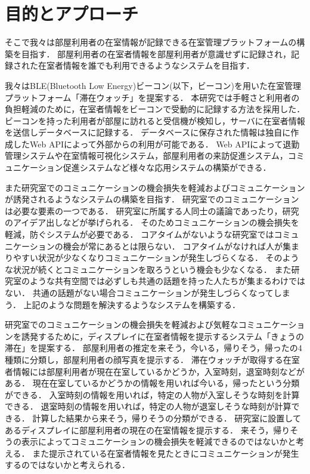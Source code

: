 \section{目的とアプローチ}\label{1.2}
そこで我々は部屋利用者の在室情報が記録できる在室管理プラットフォームの構築を目指す．
部屋利用者の在室者情報を部屋利用者が意識せずに記録され，記録された在室者情報を誰でも利用できるようなシステムを目指す．

我々はBLE(Bluetooth Low Energy)ビーコン(以下，ビーコン)\cite{beacon}を用いた在室管理プラットフォーム「滞在ウォッチ」を提案する．
本研究では手軽さと利用者の負担軽減のために，在室者情報をビーコンで受動的に記録する方法を採用した．%
ビーコンを持った利用者が部屋に訪れると受信機が検知し，サーバに在室者情報を送信しデータベースに記録する．
データベースに保存された情報は独自に作成したWeb APIによって外部からの利用が可能である．
Web APIによって退勤管理システムや在室情報可視化システム，部屋利用者の来訪促進システム，コミュニケーション促進システムなど様々な応用システムの構築ができる．

また研究室でのコミュニケーションの機会損失を軽減およびコミュニケーションが誘発されるようなシステムの構築を目指す．
研究室でのコミュニケーションは必要な要素の一つである．
研究室に所属する人同士の議論であったり，研究のアイデア出しなどが挙げられる．
そのためコミュニケーションの機会損失を軽減，防ぐシステムが必要である．
コアタイムがないような研究室ではコミュニケーションの機会が常にあるとは限らない．
コアタイムがなければ人が集まりやすい状況が少なくなりコミュニケーションが発生しづらくなる．
そのような状況が続くとコミュニケーションを取ろうという機会も少なくなる．
また研究室のような共有空間では必ずしも共通の話題を持った人たちが集まるわけではない．
共通の話題がない場合コミュニケーションが発生しづらくなってしまう．
上記のような問題を解決するようなシステムを構築する．

研究室でのコミュニケーションの機会損失を軽減および気軽なコミュニケーションを誘発するために，ディスプレイに在室者情報を提示するシステム「きょうの滞在」を提案する．
部屋利用者の推定を来そう，今いる，帰りそう，帰ったの4種類に分類し，部屋利用者の顔写真を提示する．
滞在ウォッチが取得する在室者情報には部屋利用者が現在在室しているかどうか，入室時刻，退室時刻などがある．
現在在室しているかどうかの情報を用いれば今いる，帰ったという分類ができる．
入室時刻の情報を用いれば，特定の人物が入室しそうな時刻を計算できる．
退室時刻の情報を用いれば，特定の人物が退室しそうな時刻が計算できる．
計算した結果から来そう，帰りそうの分類ができる．
研究室に設置してあるディスプレイに部屋利用者の現在の在室情報を提示する．
来そう，帰りそうの表示によってコミュニケーションの機会損失を軽減できるのではないかと考える．
また提示されている在室者情報を見たときにコミュニケーションが発生するのではないかと考えられる．